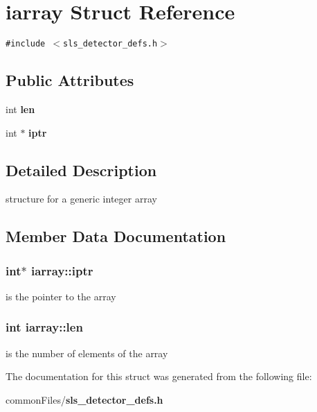 \section{iarray Struct Reference}
\label{structiarray}
{\tt \#include $<$sls\_\-detector\_\-defs.h$>$}

\subsection*{Public Attributes}
\begin{CompactItemize}
\item 
int \bf{len}
\item 
int $\ast$ \bf{iptr}
\end{CompactItemize}


\subsection{Detailed Description}
structure for a generic integer array 



\subsection{Member Data Documentation}
\subsubsection{\setlength{\rightskip}{0pt plus 5cm}int$\ast$ \bf{iarray::iptr}}\label{structiarray_65e4e79e4c42d1d3b075d84bff7046c4}


is the pointer to the array 
\subsubsection{\setlength{\rightskip}{0pt plus 5cm}int \bf{iarray::len}}\label{structiarray_97fedf6b925f79b2883d07300b266869}


is the number of elements of the array 

The documentation for this struct was generated from the following file:\begin{CompactItemize}
\item 
common\-Files/\bf{sls\_\-detector\_\-defs.h}\end{CompactItemize}
